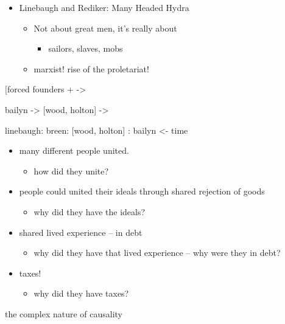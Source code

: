 \documentclass[letterpaper]{article}
\begin{document}
\begin{itemize}
\begin{itemize}
\item Linebaugh and Rediker: Many Headed Hydra

\begin{itemize}
\item Not about great men, it's really about

\begin{itemize}
\item sailors, slaves, mobs
\end{itemize}

\item marxist! rise of the proletariat!
\end{itemize}
\end{itemize}
\end{itemize}

[forced founders + ->

bailyn -> [wood, holton] ->

linebaugh: breen: [wood, holton] : bailyn <- time

\begin{itemize}
\item many different people united.

\begin{itemize}
\item how did they unite?
\end{itemize}

\item people could united their ideals through shared rejection of goods

\begin{itemize}
\item why did they have the ideals?
\end{itemize}

\item shared lived experience -- in debt

\begin{itemize}
\item why did they have that lived experience -- why were they in debt?
\end{itemize}

\item taxes!

\begin{itemize}
\item why did they have taxes?
\end{itemize}
\end{itemize}

the complex nature of causality
\end{document}
